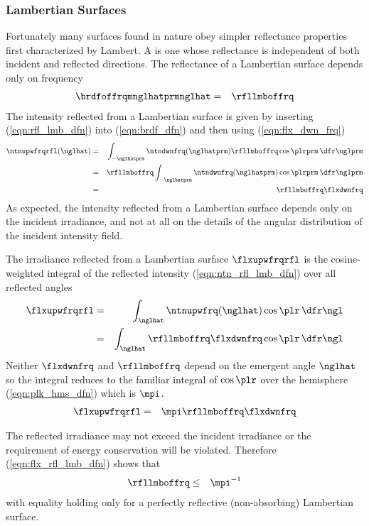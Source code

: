 \documentclass[12pt]{article}
\begin{document}
\subsubsection[Lambertian Surfaces]{Lambertian Surfaces}\label{sxn:lmb}
Fortunately many surfaces found in nature obey simpler reflectance
properties first characterized by Lambert.
A  is one whose reflectance is independent
of both incident and reflected directions.
The reflectance of a Lambertian surface depends only on frequency
\begin{eqnarray}
\brdfoffrqmnglhatprmnglhat & = & \rfllmboffrq
\label{eqn:rfl_lmb_dfn}
\end{eqnarray}
The intensity reflected from a Lambertian surface is given by 
inserting (\ref{eqn:rfl_lmb_dfn}) into (\ref{eqn:brdf_dfn}) and then
using (\ref{eqn:flx_dwn_frq})
\begin{eqnarray}
\ntnupwfrqrfl(\nglhat) 
& = & 
\int_{-\nglhatprm} 
\ntndwnfrq(\nglhatprm) \rfllmboffrq \cos \plrprm
\,\dfr\nglprm \nonumber \\
& = & 
\rfllmboffrq 
\int_{-\nglhatprm} \ntndwnfrq(\nglhatprm) \cos \plrprm
\,\dfr\nglprm \nonumber \\
& = & 
\rfllmboffrq \flxdwnfrq
\label{eqn:ntn_rfl_lmb_dfn}
\end{eqnarray}
As expected, the intensity reflected from a Lambertian surface depends 
only on the incident irradiance, and not at all on the details of the 
angular distribution of the incident intensity field.

The irradiance reflected from a Lambertian surface $\flxupwfrqrfl$ is
the cosine-weighted integral of the reflected intensity
(\ref{eqn:ntn_rfl_lmb_dfn}) over all reflected angles 
\begin{eqnarray}
\flxupwfrqrfl
& = & 
\int_{\nglhat}
\ntnupwfrq(\nglhat) \cos \plr \,\dfr\ngl \nonumber \\
& = & 
\int_{\nglhat}
\rfllmboffrq \flxdwnfrq \cos \plr \,\dfr\ngl \nonumber
\end{eqnarray}
Neither $\flxdwnfrq$ and $\rfllmboffrq$ depend on the emergent angle
$\nglhat$ so the integral reduces to the familiar integral of 
$\cos \plr$ over the hemisphere (\ref{eqn:plk_hms_dfn}) which is $\mpi$.
\begin{eqnarray}
\flxupwfrqrfl
& = & 
\mpi \rfllmboffrq \flxdwnfrq 
\label{eqn:flx_rfl_lmb_dfn}
\end{eqnarray}

The reflected irradiance may not exceed the incident irradiance
or the requirement of energy conservation will be violated.
Therefore (\ref{eqn:flx_rfl_lmb_dfn}) shows that 
\begin{eqnarray}
\rfllmboffrq & \le &\mpi^{-1}
\label{eqn:rfl_lmb_lmt}
\end{eqnarray}
with equality holding only for a perfectly reflective (non-absorbing)
Lambertian surface. 
\end{document}

